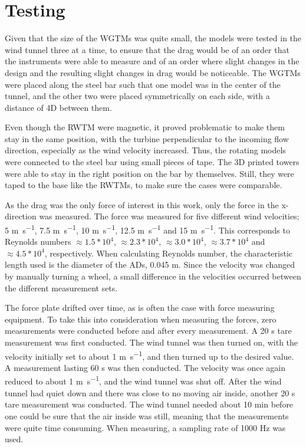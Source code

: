 \section{Testing}
Given that the size of the \gls{WGTM}s was quite small, the models were tested in the wind tunnel three at a time, to ensure that the drag would be of an order that the instruments were able to measure and of an order where slight changes in the design and the resulting slight changes in drag would be noticeable. The \gls{WGTM}s were placed  along the steel bar such that one model was in the center of the tunnel, and the other two were placed symmetrically on each side, with a distance of 4D between them.  %

Even though the \gls{RWTM} were magnetic, it proved problematic to make them stay in the same position, with the turbine perpendicular to the incoming flow direction, especially as the wind velocity increased. Thus, the rotating models were connected to the steel bar using small pieces of tape. The 3D printed towers were able to stay in the right position on the bar by themselves. Still, they were taped to the base like the \gls{RWTM}s, to make sure the cases were comparable. 

As the drag was the only force of interest in this work, only the force in the x-direction was measured. The force was measured for five different wind velocities; 5 \si{\m\per\s}, 7.5 \si{\m\per\s}, 10 \si{\m\per\s}, 12.5 \si{\m\per\s} and 15 \si{\m\per\s}. This corresponds to Reynolds numbers $ \approx 1.5*10^4$, $\approx 2.3*10^4$, $ \approx 3.0*10^4$, $\approx 3.7*10^4$ and $\approx 4.5*10^4$, respectively. When calculating Reynolds number, the characteristic length used is the diameter of the \gls{AD}s, 0.045 \si{\m}. Since the velocity was changed by manually turning a wheel, a small difference in the velocities occurred between the different measurement sets. 

The force plate drifted over time, as is often the case with force measuring equipment. To take this into consideration when measuring the forces, zero measurements were conducted before and after every measurement. A 20 \si{\s} tare measurement was first conducted. The wind tunnel was then turned on, with the velocity initially set to about 1 \si{\m\per\s}, and then turned up to the desired value. A measurement lasting 60 \si{s} was then conducted. The velocity was once again reduced to about 1 \si{\m\per\s}, and the wind tunnel was shut off. After the wind tunnel had quiet down and there was close to no moving air inside, another 20 \si{\s} tare measurement was conducted. The wind tunnel needed about 10 \si{\minute} before one could be sure that the air inside was still, meaning that the measurements were quite time consuming. When measuring, a sampling rate of 1000 \si{\hertz} was used.  

